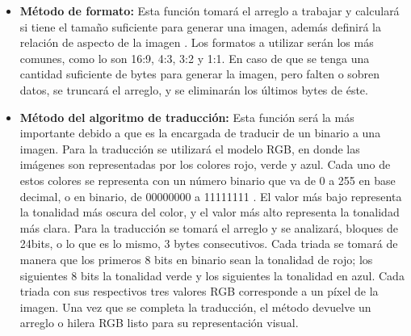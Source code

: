     
\begin{itemize}
    \item \textbf{Método de formato:} 
    Esta función tomará el arreglo a trabajar y calculará si tiene el tamaño suficiente para generar una imagen, además definirá la relación de aspecto de la imagen . Los formatos a utilizar serán los más comunes, como lo son 16:9, 4:3, 3:2 y 1:1. En caso de que se tenga una cantidad suficiente de bytes para generar la imagen, pero falten o sobren datos, se truncará el arreglo, y se eliminarán los últimos bytes de éste.
    \item \textbf{Método del algoritmo de traducción:} Esta función será la más importante debido a que es la encargada de traducir de un binario a una imagen. Para la traducción se utilizará el modelo RGB, en donde las imágenes son representadas por los colores rojo, verde y azul. Cada uno de estos colores se representa con un número binario que va de 0 a 255 en base decimal, o en binario, de 00000000 a 11111111 \cite{R5}. El valor más bajo representa la tonalidad más oscura del color, y el valor más alto representa la tonalidad más clara. Para la traducción se tomará el arreglo y se analizará, bloques de 24bits, o lo que es lo mismo, 3 bytes consecutivos. Cada triada se tomará de manera que los primeros 8 bits en binario sean la tonalidad de rojo; los siguientes 8 bits la tonalidad verde y los siguientes la tonalidad en azul. Cada triada con sus respectivos tres valores RGB corresponde a un píxel de la imagen. Una vez que se completa la traducción, el método devuelve un arreglo o hilera RGB listo para su representación visual.
\end{itemize}



